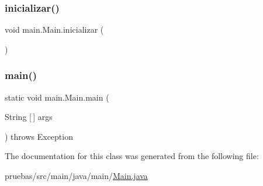 \subsubsection{\texorpdfstring{inicializar()}{inicializar()}}
{\footnotesize\ttfamily void main.\+Main.\+inicializar (\begin{DoxyParamCaption}{ }\end{DoxyParamCaption})}

\mbox{\label{classmain_1_1_main_a896f71a651b705304693dbfe0cf9ca63}} 
\subsubsection{\texorpdfstring{main()}{main()}}
{\footnotesize\ttfamily static void main.\+Main.\+main (\begin{DoxyParamCaption}\item[{String \mbox{[}$\,$\mbox{]}}]{args }\end{DoxyParamCaption}) throws Exception\hspace{0.3cm}{\ttfamily [static]}}



The documentation for this class was generated from the following file\+:\begin{DoxyCompactItemize}
\item 
pruebas/src/main/java/main/\mbox{\hyperlink{_main_8java}{Main.\+java}}\end{DoxyCompactItemize}
